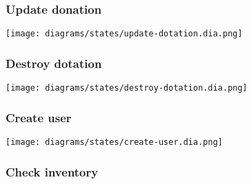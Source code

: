 \subsubsection{Update donation}
\texttt{[image: diagrams/states/update-dotation.dia.png]}

\subsubsection{Destroy dotation}
\texttt{[image: diagrams/states/destroy-dotation.dia.png]}

\subsubsection{Create user}
\texttt{[image: diagrams/states/create-user.dia.png]}

\subsubsection{Check inventory}

